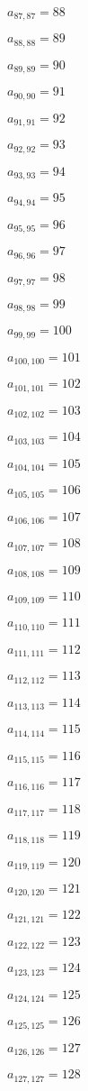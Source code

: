 \documentclass[a4paper,12pt]{article}
\begin{document}
$a _{ 87, 87 } = 88$

$a _{ 88, 88 } = 89$

$a _{ 89, 89 } = 90$

$a _{ 90, 90 } = 91$

$a _{ 91, 91 } = 92$

$a _{ 92, 92 } = 93$

$a _{ 93, 93 } = 94$

$a _{ 94, 94 } = 95$

$a _{ 95, 95 } = 96$

$a _{ 96, 96 } = 97$

$a _{ 97, 97 } = 98$

$a _{ 98, 98 } = 99$

$a _{ 99, 99 } = 100$

$a _{ 100, 100 } = 101$

$a _{ 101, 101 } = 102$

$a _{ 102, 102 } = 103$

$a _{ 103, 103 } = 104$

$a _{ 104, 104 } = 105$

$a _{ 105, 105 } = 106$

$a _{ 106, 106 } = 107$

$a _{ 107, 107 } = 108$

$a _{ 108, 108 } = 109$

$a _{ 109, 109 } = 110$

$a _{ 110, 110 } = 111$

$a _{ 111, 111 } = 112$

$a _{ 112, 112 } = 113$

$a _{ 113, 113 } = 114$

$a _{ 114, 114 } = 115$

$a _{ 115, 115 } = 116$

$a _{ 116, 116 } = 117$

$a _{ 117, 117 } = 118$

$a _{ 118, 118 } = 119$

$a _{ 119, 119 } = 120$

$a _{ 120, 120 } = 121$

$a _{ 121, 121 } = 122$

$a _{ 122, 122 } = 123$

$a _{ 123, 123 } = 124$

$a _{ 124, 124 } = 125$

$a _{ 125, 125 } = 126$

$a _{ 126, 126 } = 127$

$a _{ 127, 127 } = 128$
\end{document}
